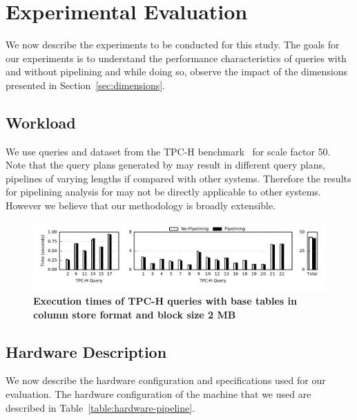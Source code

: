 \section{Experimental Evaluation}\label{sec:experiments}
We now describe the experiments to be conducted for this study.
The goals for our experiments is to understand the performance characteristics of queries with and without pipelining and while doing so, observe the impact of the dimensions presented in Section~\ref{sec:dimensions}. 

\subsection{Workload}
We use queries and dataset from the TPC-H benchmark~\cite{tpc-h} for scale factor 50.
Note that the query plans generated by \sys{} may result in different query plans, pipelines of varying lengths if compared with other systems.
Therefore the results for pipelining analysis for \sys{} may not be directly applicable to other systems.
However we believe that our methodology is broadly extensible. 

\begin{figure}[ht]
	\centering 
	\includegraphics{pipeline/figures/colstore-20threads-bs2mb-withlip-alltpch}
	\caption{\textbf{Execution times of TPC-H queries with base tables in column store format and block size 2 MB}}
	\label{fig:absolute-times-all-tpch-bs2mb-20threads}
\end{figure}

\subsection{Hardware Description}\label{ssec:hardware-description}
We now describe the hardware configuration and \sys{} specifications used for our evaluation. 
The hardware configuration of the machine that we used are described in Table~\ref{table:hardware-pipeline}.

